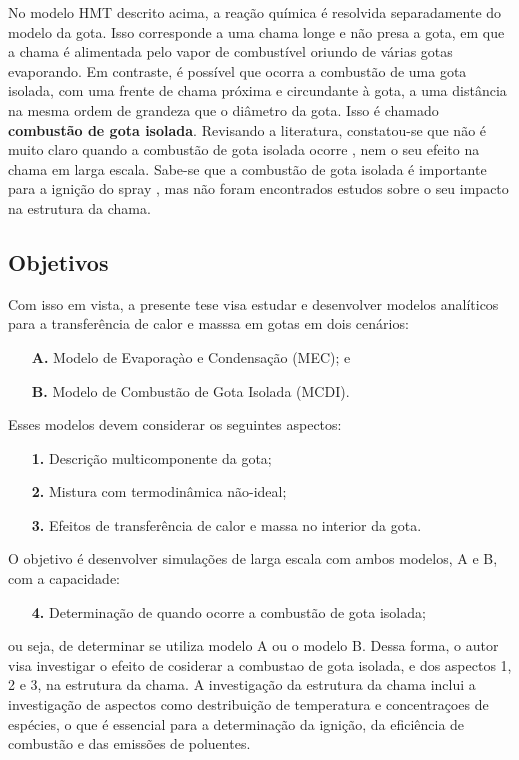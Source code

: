 No modelo HMT descrito acima, a reação química é resolvida separadamente do modelo da gota.
Isso corresponde a uma chama longe e não presa a gota, em que a chama é alimentada pelo vapor de combustível oriundo de várias gotas evaporando. 
Em contraste, é possível que ocorra a combustão de uma gota isolada, com uma frente de chama próxima e circundante à gota, a uma distância na mesma ordem de grandeza que o diâmetro da gota.
Isso é chamado \textbf{combustão de gota isolada}.
Revisando a literatura, constatou-se que não é muito claro quando a combustão de gota isolada ocorre \source{}, nem o seu efeito na chama em larga escala.
Sabe-se que a combustão de gota isolada é importante para a ignição do spray \cite{AggarwalS2014}, mas não foram encontrados estudos sobre o seu impacto na estrutura da chama.

\subsection{Objetivos}

Com isso em vista, a presente tese visa estudar e desenvolver modelos analíticos para a transferência de calor e masssa em gotas em dois cenários: 
\begin{enumerate}
    \item[\textbf{A.}] Modelo de Evaporaçào e Condensação (MEC); e 
    \item[\textbf{B.}] Modelo de Combustão de Gota Isolada (MCDI).
\end{enumerate}
Esses modelos devem considerar os seguintes aspectos: 
\begin{enumerate}
    \item[\textbf{1.}] Descrição multicomponente da gota; 
    \item[\textbf{2.}] Mistura com termodinâmica não-ideal; 
    \item[\textbf{3.}] Efeitos de transferência	de calor e massa no interior da gota. 
\end{enumerate}
O objetivo é desenvolver simulações de larga escala com ambos modelos, {A} e {B}, com a capacidade:
\begin{enumerate}
    \item[\textbf{4.}] Determinação de quando ocorre a combustão de gota isolada;
\end{enumerate}
ou seja, de determinar se utiliza modelo {A} ou o modelo {B}.
Dessa forma, o autor visa investigar o efeito de cosiderar a combustao de gota isolada, e dos aspectos {1}, {2} e {3}, na estrutura da chama.
A investigação da estrutura da chama inclui a investigação de aspectos como destribuição de temperatura e concentraçoes de espécies, o que é essencial para a determinação da ignição, da eficiência de combustão e das emissões de poluentes.


